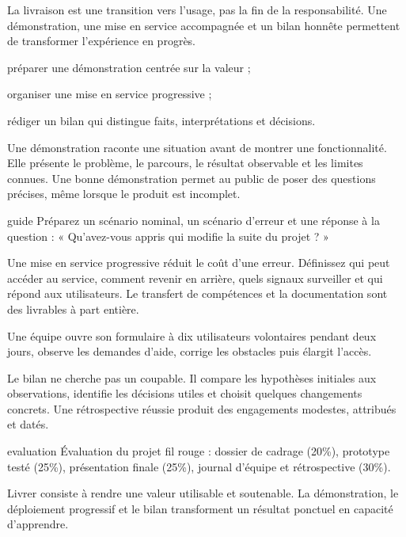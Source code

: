 \documentclass[12pt,twoside]{upbcours}
\begin{document}
\introduction
\begin{survol}
  La livraison est une transition vers l'usage, pas la fin de la responsabilité. Une démonstration,
  une mise en service accompagnée et un bilan honnête permettent de transformer l'expérience en progrès.
\end{survol}
\begin{objectifs}
  \item préparer une démonstration centrée sur la valeur ;
  \item organiser une mise en service progressive ;
  \item rédiger un bilan qui distingue faits, interprétations et décisions.
\end{objectifs}
Une démonstration raconte une situation avant de montrer une fonctionnalité. Elle présente le
problème, le parcours, le résultat observable et les limites connues. Une bonne démonstration
permet au public de poser des questions précises, même lorsque le produit est incomplet.
\begin{icone}{guide}
  Préparez un scénario nominal, un scénario d'erreur et une réponse à la question :
  « Qu'avez-vous appris qui modifie la suite du projet ? »
\end{icone}
Une mise en service progressive réduit le coût d'une erreur. Définissez qui peut accéder au service,
comment revenir en arrière, quels signaux surveiller et qui répond aux utilisateurs. Le transfert
de compétences et la documentation sont des livrables à part entière.
\begin{exemple}
  Une équipe ouvre son formulaire à dix utilisateurs volontaires pendant deux jours, observe les
  demandes d'aide, corrige les obstacles puis élargit l'accès.
\end{exemple}
Le bilan ne cherche pas un coupable. Il compare les hypothèses initiales aux observations, identifie
les décisions utiles et choisit quelques changements concrets. Une rétrospective réussie produit
des engagements modestes, attribués et datés.
\begin{icone}{evaluation}
  Évaluation du projet fil rouge : dossier de cadrage (20\%), prototype testé (25\%), présentation
  finale (25\%), journal d'équipe et rétrospective (30\%).
\end{icone}
\begin{resumechapitre}
  Livrer consiste à rendre une valeur utilisable et soutenable. La démonstration, le déploiement
  progressif et le bilan transforment un résultat ponctuel en capacité d'apprendre.
\end{resumechapitre}
\end{document}
